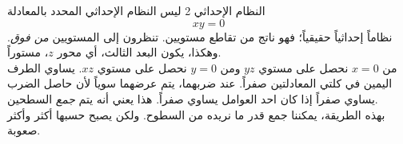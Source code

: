 \begin{surferPage}[إحداثيات 2]{النظام الإحداثي 2}
ليس النظام الإحداثي المحدد بالمعادلة 
\[xy=0\]
نظاماً إحداثياً حقيقياً؛ فهو ناتج من تقاطع مستويين. تنظرون إلى المستويين {\it من فوق}. وهكذا، يكون البعد الثالث، أي محور $z$، مستوراً. \\
\vspace{0.3cm}
من $x=0$ نحصل على مستوي $yz$ ومن $y=0$ نحصل على مستوي $xz$. 
يساوي الطرف اليمين في كلتي المعادلتين صفراً. عند ضربهما، يتم عرضهما سوياً لأن حاصل الضرب يساوي صفراً إذا كان احد العوامل يساوي صفراً. هذا يعني أنه يتم {\it جمع} السطحين. \\
بهذه الطريقة، يمكننا جمع قدر ما نريده من السطوح. ولكن يصبح حسبها أكثر وأكثر صعوبة.
\end{surferPage}
